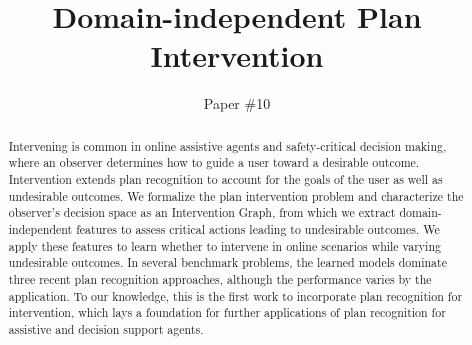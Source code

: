 \documentclass[letterpaper]{article}
\theoremstyle{plain}
\begin{document}
\title{Domain-independent Plan Intervention}
\author{ Paper \#10}
\newcommand{\debug}[2]{[\textbf{DEBUG #1}: \textcolor{WildStrawberry}{\textit{#2}}]}
\nocopyright
\maketitle
\begin{abstract}
Intervening is common in online assistive agents and safety-critical decision making, where an observer determines how to guide a user toward a desirable outcome.
Intervention extends plan recognition to account for the goals of the user as well as undesirable outcomes.
We formalize the plan intervention problem and characterize the observer's decision space as an Intervention Graph, from which 
we extract domain-independent features to assess critical actions leading to undesirable outcomes.
We apply these features to learn whether to intervene in online scenarios while varying undesirable outcomes.
In several benchmark problems, the learned models dominate three recent plan recognition approaches, although the performance varies by the application.
To our knowledge, this is the first work to incorporate plan recognition for intervention, which lays a foundation for further applications of plan recognition for assistive and decision support agents.
\end{abstract}

\end{document}
